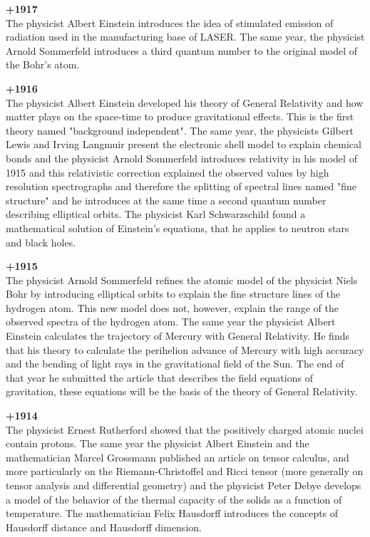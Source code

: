 \textbf{+1917}\\
The physicist Albert Einstein introduces the idea of stimulated emission of radiation used in the manufacturing base of LASER. The same year, the physicist Arnold Sommerfeld introduces a third quantum number to the original model of the Bohr's atom.

\textbf{+1916}\\
The physicist Albert Einstein developed his theory of General Relativity and how matter plays on the space-time to produce gravitational effects. This is the first theory named "background independent". The same year, the physicists Gilbert Lewis and Irving Langmuir present the electronic shell model to explain chemical bonds and the physicist Arnold Sommerfeld introduces relativity in his model of 1915 and this relativistic correction explained the observed values by high resolution spectrographs and therefore the splitting of spectral lines named "fine structure" and he introduces at the same time a second quantum number describing elliptical orbits. The physicist Karl Schwarzschild found a mathematical solution of Einstein's equations, that he applies to neutron stars and black holes.

\textbf{+1915}\\
The physicist Arnold Sommerfeld refines the atomic model of the physicist Niels Bohr by introducing elliptical orbits to explain the fine structure lines of the hydrogen atom. This new model does not, however, explain the range of the observed spectra of the hydrogen atom. The same year the physicist Albert Einstein calculates the trajectory of Mercury with General Relativity. He finds that his theory to calculate the perihelion advance of Mercury with high accuracy and the bending of light rays in the gravitational field of the Sun. The end of that year he submitted the article that describes the field equations of gravitation, these equations will be the basis of the theory of General Relativity.

\textbf{+1914}\\
The physicist Ernest Rutherford showed that the positively charged atomic nuclei contain protons. The same year the physicist Albert Einstein and the mathematician Marcel Grossmann published an article on tensor calculus, and more particularly on the Riemann-Christoffel and Ricci tensor (more generally on tensor analysis and differential geometry) and the physicist Peter Debye develops a model of the behavior of the thermal capacity of the solids as a function of temperature. The mathematician Felix Hausdorff introduces the concepts of Hausdorff distance and Hausdorff dimension.

